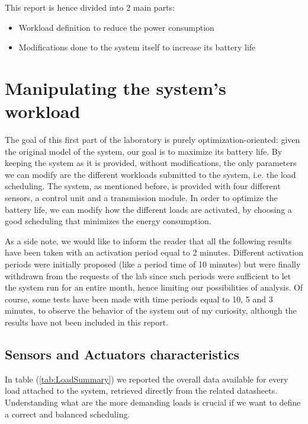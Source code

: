 \documentclass[a4paper]{article}
\begin{document}
    This report is hence divided into 2 main parts:
    \begin{itemize}
        \item Workload definition to reduce the power consumption
        \item Modifications done to the system itself to increase its battery life
    \end{itemize}

%
\section{Manipulating the system's workload}
    The goal of this first part of the laboratory is purely optimization-oriented: given the original model of the system, our goal is to maximize its battery life. By keeping the system as it is provided, without modifications, the only parameters we can modify are the different workloads submitted to the system, i.e. the load scheduling. The system, as mentioned before, is provided with four different sensors, a control unit and a transmission module. In order to optimize the battery life, we can modify how the different loads are activated, by choosing a good scheduling that minimizes the energy consumption.

    As a side note, we would like to inform the reader that all the following results have been taken with an activation period equal to 2 minutes. Different activation periods were initially proposed (like a period time of 10 minutes) but were finally withdrawn from the requests of the lab since such periods were sufficient to let the system run for an entire month, hence limiting our possibilities of analysis. Of course, some tests have been made with time periods equal to 10, 5 and 3 minutes, to observe the behavior of the system out of my curiosity, although the results have not been included in this report.

    \subsection{Sensors and Actuators characteristics}

    In table (\ref{tab:LoadSummary}) we reported the overall data available for every load attached to the system, retrieved directly from the related datasheets. Understanding what are the more demanding loads is crucial if we want to define a correct and balanced scheduling. 
    
\end{document}
